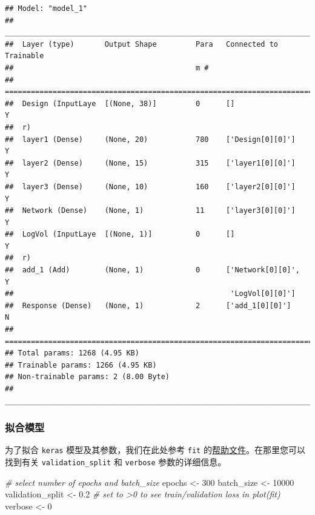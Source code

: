 \documentclass[
]{article}
\newenvironment{Shaded}{\begin{snugshade}}{\end{snugshade}}
\newcommand{\CommentTok}[1]{\textcolor[rgb]{0.56,0.35,0.01}{\textit{#1}}}
\newcommand{\DecValTok}[1]{\textcolor[rgb]{0.00,0.00,0.81}{#1}}
\newcommand{\FloatTok}[1]{\textcolor[rgb]{0.00,0.00,0.81}{#1}}
\newcommand{\NormalTok}[1]{#1}
\newcommand{\OtherTok}[1]{\textcolor[rgb]{0.56,0.35,0.01}{#1}}
\begin{document}
\begin{verbatim}
## Model: "model_1"
## ________________________________________________________________________________
##  Layer (type)       Output Shape         Para   Connected to         Trainable  
##                                          m #                                    
## ================================================================================
##  Design (InputLaye  [(None, 38)]         0      []                   Y          
##  r)                                                                             
##  layer1 (Dense)     (None, 20)           780    ['Design[0][0]']     Y          
##  layer2 (Dense)     (None, 15)           315    ['layer1[0][0]']     Y          
##  layer3 (Dense)     (None, 10)           160    ['layer2[0][0]']     Y          
##  Network (Dense)    (None, 1)            11     ['layer3[0][0]']     Y          
##  LogVol (InputLaye  [(None, 1)]          0      []                   Y          
##  r)                                                                             
##  add_1 (Add)        (None, 1)            0      ['Network[0][0]',    Y          
##                                                  'LogVol[0][0]']                
##  Response (Dense)   (None, 1)            2      ['add_1[0][0]']      N          
## ================================================================================
## Total params: 1268 (4.95 KB)
## Trainable params: 1266 (4.95 KB)
## Non-trainable params: 2 (8.00 Byte)
## ________________________________________________________________________________
\end{verbatim}

\subsubsection{拟合模型}\label{ux62dfux5408ux6a21ux578b-2}

为了拟合 \texttt{keras} 模型及其参数，我们在此处参考 \texttt{fit}
的\href{https://keras.rstudio.com/reference/fit.html}{帮助文件}。在那里您可以找到有关
\texttt{validation\_split} 和 \texttt{verbose} 参数的详细信息。

\begin{Shaded}
\begin{Highlighting}[]
\CommentTok{\# select number of epochs and batch\_size}
\NormalTok{epochs }\OtherTok{\textless{}{-}} \DecValTok{300}
\NormalTok{batch\_size }\OtherTok{\textless{}{-}} \DecValTok{10000}
\NormalTok{validation\_split }\OtherTok{\textless{}{-}} \FloatTok{0.2}  \CommentTok{\# set to \textgreater{}0 to see train/validation loss in plot(fit)}
\NormalTok{verbose }\OtherTok{\textless{}{-}} \DecValTok{0}
\end{Highlighting}
\end{Shaded}
\end{document}
